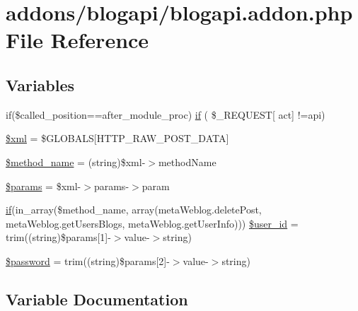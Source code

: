 \hypertarget{blogapi_8addon_8php}{}\section{addons/blogapi/blogapi.addon.\+php File Reference}
\label{blogapi_8addon_8php}
\subsection*{Variables}
\begin{DoxyCompactItemize}
\item 
if(\$called\+\_\+position==\textquotesingle{}after\+\_\+module\+\_\+proc\textquotesingle{}) \hyperlink{blogapi_8addon_8php_a836db554ec10171590637660c12ccd14}{if} ( \$\+\_\+\+R\+E\+Q\+U\+E\+ST\mbox{[} \textquotesingle{}act\textquotesingle{}\mbox{]} !=\textquotesingle{}api\textquotesingle{})
\item 
\hyperlink{blogapi_8addon_8php_aa108d9d91e700ac530401dd363b0723b}{\$xml} = \$G\+L\+O\+B\+A\+LS\mbox{[}\textquotesingle{}H\+T\+T\+P\+\_\+\+R\+A\+W\+\_\+\+P\+O\+S\+T\+\_\+\+D\+A\+TA\textquotesingle{}\mbox{]}
\item 
\hyperlink{blogapi_8addon_8php_a88c34f4701e451bbcef63e44e5902ebd}{\$method\+\_\+name} = (string)\$xml-\/$>$method\+Name
\item 
\hyperlink{blogapi_8addon_8php_afe68e6fbe7acfbffc0af0c84a1996466}{\$params} = \$xml-\/$>$params-\/$>$param
\item 
\hyperlink{config_8inc_8php_a73b98c0274e28635a594091f9ca43cb4}{if}(in\+\_\+array(\$method\+\_\+name, array(\textquotesingle{}meta\+Weblog.\+delete\+Post\textquotesingle{}, \textquotesingle{}meta\+Weblog.\+get\+Users\+Blogs\textquotesingle{}, \textquotesingle{}meta\+Weblog.\+get\+User\+Info\textquotesingle{}))) \hyperlink{blogapi_8addon_8php_ab94cd14ca14c41f3841c7a5ef01f75eb}{\$user\+\_\+id} = trim((string)\$params\mbox{[}1\mbox{]}-\/$>$value-\/$>$string)
\item 
\hyperlink{blogapi_8addon_8php_a607686ef9f99ea7c42f4f3dd3dbb2b0d}{\$password} = trim((string)\$params\mbox{[}2\mbox{]}-\/$>$value-\/$>$string)
\end{DoxyCompactItemize}


\subsection{Variable Documentation}
\hypertarget{blogapi_8addon_8php_a88c34f4701e451bbcef63e44e5902ebd}{}\label{blogapi_8addon_8php_a88c34f4701e451bbcef63e44e5902ebd} 
